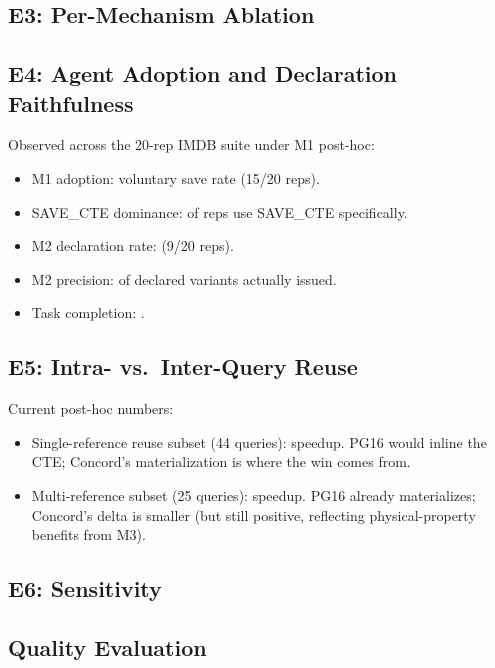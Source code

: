 \subsection{E3: Per-Mechanism Ablation}

\subsection{E4: Agent Adoption and Declaration Faithfulness}

Observed across the 20-rep IMDB suite under M1 post-hoc:
\begin{itemize}
\item M1 adoption: \adoptionRate voluntary save rate (15/20 reps).
\item SAVE\_CTE dominance: \saveCteRate of reps use SAVE\_CTE specifically.
\item M2 declaration rate: \mTwoDeclRate (9/20 reps).
\item M2 precision: \mTwoPrecision of declared variants actually issued.
\item Task completion: \taskCompletionIMDB.
\end{itemize}

\subsection{E5: Intra- vs.\ Inter-Query Reuse}

Current post-hoc numbers:
\begin{itemize}
\item Single-reference reuse subset (44 queries): \imdbSingleRefSpeedup speedup. PG16 would inline the CTE; Concord's materialization is where the win comes from.
\item Multi-reference subset (25 queries): \imdbMultiRefSpeedup speedup. PG16 already materializes; Concord's delta is smaller (but still positive, reflecting physical-property benefits from M3).
\end{itemize}

\subsection{E6: Sensitivity}

\subsection{Quality Evaluation}
